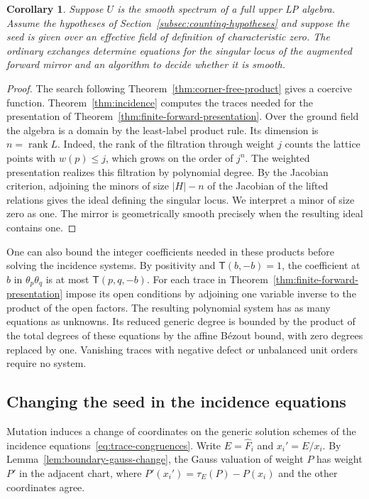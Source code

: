 \documentclass[11pt,reqno]{amsart}
\numberwithin{equation}{section}
\newtheorem{corollary}[theorem]{Corollary}
\theoremstyle{definition}
\theoremstyle{remark}
\begin{document}
\begin{corollary}\label{cor:forward-jacobian}
Suppose \(U\) is the smooth spectrum of a full upper LP algebra.
Assume the hypotheses of Section~\ref{subsec:counting-hypotheses} and
suppose the seed is given over an
effective field of definition of characteristic zero. The ordinary
exchanges determine equations for the singular locus of the augmented
forward mirror and an algorithm to decide whether it is smooth.
\end{corollary}
\begin{proof}
The search following Theorem~\ref{thm:corner-free-product} gives a
coercive function. Theorem~\ref{thm:incidence} computes the traces
needed for the presentation of Theorem~\ref{thm:finite-forward-presentation}.
Over the ground field the algebra is a domain by the least-label
product rule. Its dimension is \(n=\operatorname{rank}L\). Indeed, the rank of the
filtration through weight \(j\) counts the lattice points with
\(w(p)\le j\), which grows on the order of \(j^n\). The weighted
presentation realizes this filtration by polynomial degree.
By the Jacobian criterion, adjoining the minors of size \(|H|-n\)
of the Jacobian of the lifted relations gives the ideal defining the
singular locus. We interpret a minor of size zero as one. The mirror
is geometrically smooth precisely when the resulting ideal contains one.
\end{proof}

One can also bound the integer coefficients needed in these
products before solving the incidence systems. By positivity and
\(\mathsf T(b,-b)=1\), the coefficient at \(b\) in
\(\theta_p\theta_q\) is at most \(\mathsf T(p,q,-b)\).
For each trace in Theorem~\ref{thm:finite-forward-presentation} impose its open
conditions by adjoining one variable inverse to the product of
the open factors. The resulting polynomial system has as many
equations as unknowns. Its reduced generic degree is bounded by
the product of the total degrees of these equations by the affine B\'ezout bound, with zero degrees replaced by one. Vanishing traces
with negative defect or unbalanced unit orders require no system.

\subsection{Changing the seed in the incidence equations}

Mutation induces a change of coordinates on the generic solution
schemes of the incidence equations~\eqref{eq:trace-congruences}. Write \(E=\widehat F_i\) and
\(x_i'=E/x_i\). By Lemma~\ref{lem:boundary-gauss-change}, the Gauss
valuation of weight \(P\) has weight \(P'\) in the adjacent chart,
where \(P'(x_i')=\tau_E(P)-P(x_i)\) and the other coordinates agree.
\end{document}
